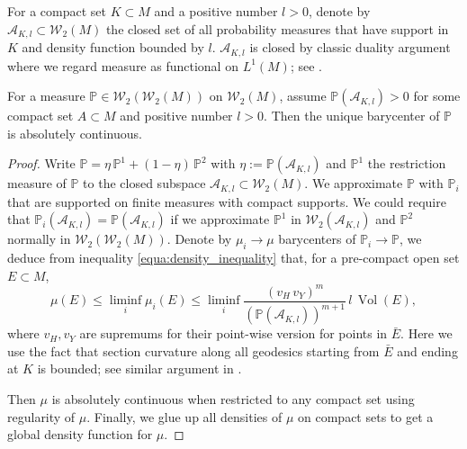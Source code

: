 For a compact set $K \subset M$ and a positive number $l > 0$,
denote by $\mathcal{A}_{K, l} \subset \mathcal{W}_2(M)$ the closed set of
all probability measures that have support in $K$ and density function bounded by $l$.
$\mathcal{A}_{K, l}$ is closed by classic duality argument
where we regard measure as functional on $L^1(M)$; see \cite[Theorem 4.4.1]{Bogachev2007}.

\begin{thm}
	For a measure $\mathbb{P} \in \mathcal{W}_2(\mathcal{W}_2(M))$ on $\mathcal{W}_2(M)$,
	assume $\mathbb{P}(\mathcal{A}_{K,l}) >0$ for some compact set $A \subset M$ and positive
	number $l > 0$.
	Then the unique barycenter of $\mathbb{P}$
	is absolutely continuous.
\end{thm}

\begin{proof}
	Write $\mathbb{P} = \eta\, \mathbb{P}^1 + (1 - \eta)\, \mathbb{P}^2$ with
	$\eta := \mathbb{P}(\mathcal{A}_{K,l})$ and $\mathbb{P}^1$ the
	restriction measure of $\mathbb{P}$ to the closed subspace $\mathcal{A}_{K,l} \subset \mathcal{W}_2(M)$.
	We approximate $\mathbb{P}$ with $ \mathbb{P}_i $
	that are supported on finite measures with compact supports.
	We could require that $\mathbb{P}_i (\mathcal{A}_{K,l}) = \mathbb{P} (\mathcal{A}_{K,l})$
	if we approximate $\mathbb{P}^1 $ in $\mathcal{W}_2(\mathcal{A}_{K,l})$
	and $\mathbb{P}^2$ normally in $\mathcal{W}_2(\mathcal{W}_2(M))$.
	Denote by $\mu_i \rightarrow \mu$ barycenters of $\mathbb{P}_i \rightarrow \mathbb{P}$,
	we deduce from inequality \cref{equa:density_inequality} that,
	for a pre-compact open set $E \subset M$,
	\[
		\mu(E) \leq \liminf_i \mu_i(E) \leq
		\liminf_i \frac{(v_H\, v_Y)^m}{(\mathbb{P}(\mathcal{A}_{K,l}))^{m+1}}
		\,l\, \operatorname{Vol}(E),
	\]
	where $v_H, v_Y$ are supremums for their point-wise version for points in $\bar{E}$.
	Here we use the fact that section curvature along all geodesics starting from $\bar{E}$ and
	ending at $K$ is bounded;
	see similar argument in \cite[Corollary 3.3.7]{cordero2001riemannian}.

	Then $\mu$ is absolutely continuous when restricted to any compact set using regularity of $\mu$.
	Finally, we glue up all densities of $\mu$ on compact sets to get a global density function for $\mu$.
\end{proof}

